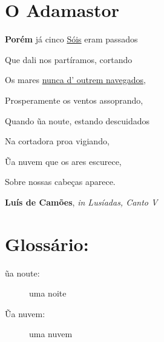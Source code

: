 \documentclass{report}
\begin{document}
\chapter{O Adamastor }



\begin{center}

\textbf{Porém} já cinco \underline{Sóis} eram passados

Que dali nos partíramos, cortando

Os mares \underline{nunca d' outrem navegados},

Prosperamente os ventos assoprando,

Quando ũa noute, estando descuidados

Na cortadora proa vigiando,

Ũa nuvem que os ares escurece,

Sobre nossas cabeças aparece.



\textbf{Luís de Camões}, \textit{in Lusíadas, Canto V}
\end{center}



\chapter{Glossário:}

\begin{description}
\item [ũa noute:] uma noite 
\item [Ũa nuvem:] uma nuvem 
\end{description}
\end{document}
